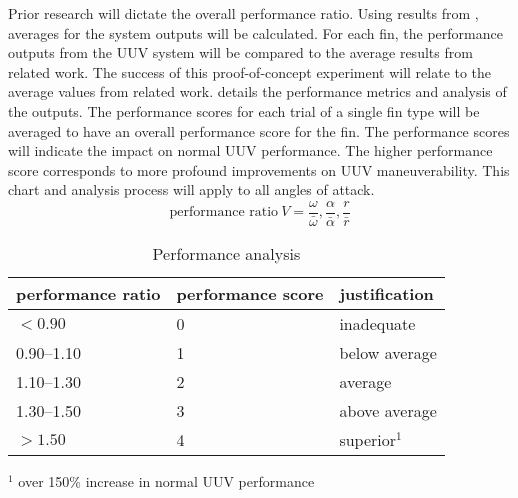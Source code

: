 \documentclass[]{IEEEtran}
\begin{document}
Prior research will dictate the overall performance ratio.  Using results from \cite{hiller2012expanding, berenice2018splash, orourke2020navy}, averages for the system outputs will be calculated.  For each fin, the performance outputs from the UUV system will be compared to the average results from related work.  The success of this proof-of-concept experiment will relate to the average values from related work.   details the performance metrics and analysis of the outputs.  The performance scores for each trial of a single fin type will be averaged to have an overall performance score for the fin.  The performance scores will indicate the impact on normal UUV performance.  The higher performance score corresponds to more profound improvements on UUV maneuverability.  This chart and analysis process will apply to all angles of attack.    
\begin{equation}
\mbox{performance ratio}\ V = \frac{\omega}{\bar{\omega}}, \frac{\alpha}{\bar{\alpha}}, \frac{r}{\bar{r}} 
\label{eq:performanceratio}
\end{equation}

\begin{table}
\caption{Performance analysis}
\label{tab:1}
\begin{center}
\begin{tabular}{lll}
\toprule
performance ratio & performance score & justification \\
\midrule 
$< \num{0.90}$ & 0 & inadequate \\
\numrange{0.90}{1.10} & 1 & below average \\
\numrange{1.10}{1.30} & 2 & average \\
\numrange{1.30}{1.50} & 3 & above average \\
$> \num{1.50}$ & 4 & superior$^1$\\
\bottomrule
\end{tabular}

\vspace{1em}
$^1$ over 150\% increase in normal UUV performance
\end{center}
\end{table}
\end{document}

